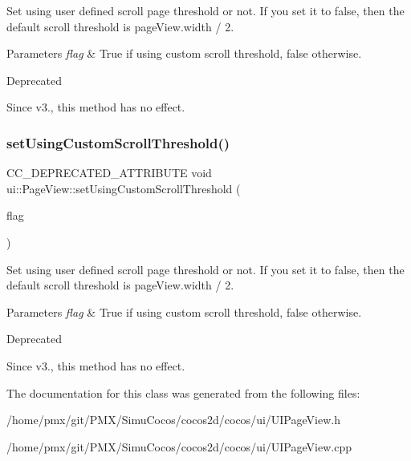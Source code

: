 Set using user defined scroll page threshold or not. If you set it to false, then the default scroll threshold is page\+View.\+width / 2. 


\begin{DoxyParams}{Parameters}
{\em flag} & True if using custom scroll threshold, false otherwise. \\
\hline
\end{DoxyParams}
\begin{DoxyRefDesc}{Deprecated}
\item[\hyperlink{deprecated__deprecated000153}{Deprecated}]Since v3., this method has no effect. \end{DoxyRefDesc}
\mbox{\label{classui_1_1PageView_ae173b8839db817ed5aa09a910b8169aa}} 
\subsubsection{\texorpdfstring{set\+Using\+Custom\+Scroll\+Threshold()}{setUsingCustomScrollThreshold()}\hspace{0.1cm}{\footnotesize\ttfamily [2/2]}}
{\footnotesize\ttfamily C\+C\+\_\+\+D\+E\+P\+R\+E\+C\+A\+T\+E\+D\+\_\+\+A\+T\+T\+R\+I\+B\+U\+TE void ui\+::\+Page\+View\+::set\+Using\+Custom\+Scroll\+Threshold (\begin{DoxyParamCaption}\item[{bool}]{flag }\end{DoxyParamCaption})}



Set using user defined scroll page threshold or not. If you set it to false, then the default scroll threshold is page\+View.\+width / 2. 


\begin{DoxyParams}{Parameters}
{\em flag} & True if using custom scroll threshold, false otherwise. \\
\hline
\end{DoxyParams}
\begin{DoxyRefDesc}{Deprecated}
\item[\hyperlink{deprecated__deprecated000388}{Deprecated}]Since v3., this method has no effect. \end{DoxyRefDesc}


The documentation for this class was generated from the following files\+:\begin{DoxyCompactItemize}
\item 
/home/pmx/git/\+P\+M\+X/\+Simu\+Cocos/cocos2d/cocos/ui/U\+I\+Page\+View.\+h\item 
/home/pmx/git/\+P\+M\+X/\+Simu\+Cocos/cocos2d/cocos/ui/U\+I\+Page\+View.\+cpp\end{DoxyCompactItemize}
